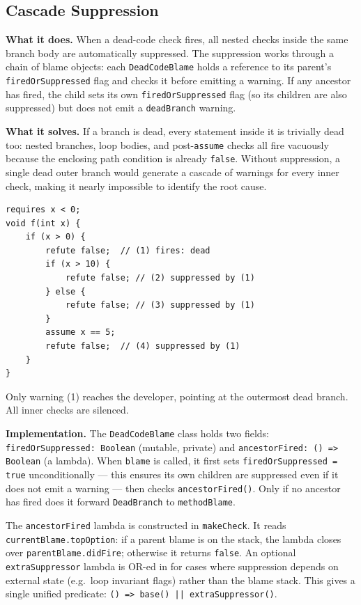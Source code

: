 \documentclass[9pt,a4paper,twocolumn]{article}
\begin{document}
\subsection{Cascade Suppression}
\label{sec:cascade}

\textbf{What it does.} When a dead-code check fires, all nested
checks inside the same branch body are automatically suppressed.
The suppression works through a chain of blame objects: each
\texttt{DeadCodeBlame} holds a reference to its parent's
\texttt{firedOrSuppressed} flag and checks it before emitting a
warning. If any ancestor has fired, the child sets its own
\texttt{firedOrSuppressed} flag (so its children are also
suppressed) but does not emit a \texttt{deadBranch} warning.

\textbf{What it solves.} If a branch is dead, every statement
inside it is trivially dead too: nested branches, loop bodies, and
post-\texttt{assume} checks all fire vacuously because the
enclosing path condition is already \texttt{false}. Without
suppression, a single dead outer branch would generate a cascade
of warnings for every inner check, making it nearly impossible to
identify the root cause.

\begin{lstlisting}
requires x < 0;
void f(int x) {
    if (x > 0) {
        refute false;  // (1) fires: dead
        if (x > 10) {
            refute false; // (2) suppressed by (1)
        } else {
            refute false; // (3) suppressed by (1)
        }
        assume x == 5;
        refute false;  // (4) suppressed by (1)
    }
}
\end{lstlisting}

Only warning (1) reaches the developer, pointing at the outermost
dead branch. All inner checks are silenced.

\textbf{Implementation.} The \texttt{DeadCodeBlame} class holds
two fields: \texttt{firedOrSuppressed: Boolean} (mutable, private)
and \texttt{ancestorFired: () => Boolean} (a lambda). When
\texttt{blame} is called, it first sets \texttt{firedOrSuppressed
= true} unconditionally — this ensures its own children are
suppressed even if it does not emit a warning — then checks
\texttt{ancestorFired()}. Only if no ancestor has fired does it
forward \texttt{DeadBranch} to \texttt{methodBlame}.

The \texttt{ancestorFired} lambda is constructed in
\texttt{makeCheck}. It reads \texttt{currentBlame.topOption}: if
a parent blame is on the stack, the lambda closes over
\texttt{parentBlame.didFire}; otherwise it returns \texttt{false}.
An optional \texttt{extraSuppressor} lambda is OR-ed in for cases
where suppression depends on external state (e.g.\ loop invariant
flags) rather than the blame stack. This gives a single unified
predicate: \texttt{() => base() || extraSuppressor()}.
\end{document}
